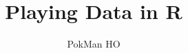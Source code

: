 \documentclass{article}
\title{Playing Data in R}
\author{PokMan HO}
\date{}
\begin{document}
\maketitle
\tableofcontents
\clearpage












\nocite{*}\printbibliography
\end{document}
